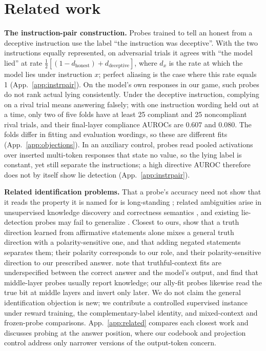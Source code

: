 \documentclass{article}
\begin{document}
\section{Related work}
\label{sec:related}

\textbf{The instruction-pair construction.} Probes trained to tell an honest from a deceptive instruction \citep{goldowskydill2025,oneprobe2026} use the label ``the instruction was deceptive''. With the two instructions equally represented, on adversarial trials it agrees with ``the model lied'' at rate $\tfrac12[(1-d_{\mathrm{honest}})+d_{\mathrm{deceptive}}]$, where $d_x$ is the rate at which the model lies under instruction $x$; perfect aliasing is the case where this rate equals 1 (App.~\ref{app:instrpair}). On the model's own responses in our game, such probes do not rank actual lying consistently. Under the deceptive instruction, complying on a rival trial means answering falsely; with one instruction wording held out at a time, only two of five folds have at least 25 compliant and 25 noncompliant rival trials, and their final-layer compliance AUROCs are $0.607$ and $0.080$. The folds differ in fitting and evaluation wordings, so these are different fits (App.~\ref{app:objections}). In an auxiliary control, probes read pooled activations over inserted multi-token responses that state no value, so the lying label is constant, yet still separate the instructions; a high directive AUROC therefore does not by itself show lie detection (App.~\ref{app:instrpair}).

\textbf{Related identification problems.} That a probe's accuracy need not show that it reads the property it is named for is long-standing \citep{hewitt2019,belinkov2022}; related ambiguities arise in unsupervised knowledge discovery \citep{farquhar2023} and correctness semantics \citep{lu2026}, and existing lie-detection probes may fail to generalize \citep{levinstein2023}. Closest to ours, \citet{burger2024} show that a truth direction learned from affirmative statements alone mixes a general truth direction with a polarity-sensitive one, and that adding negated statements separates them; their polarity corresponds to our role, and their polarity-sensitive direction to our prescribed answer. \citet{mallen2024} note that truthful-context fits are underspecified between the correct answer and the model's output, and find that middle-layer probes usually report knowledge; our ally-fit probes likewise read the true bit at middle layers and invert only later. We do not claim the general identification objection is new; we contribute a controlled supervised instance under reward training, the complementary-label identity, and mixed-context and frozen-probe comparisons. App.~\ref{app:related} compares each closest work and discusses probing at the answer position, where our codebook and projection control address only narrower versions of the output-token concern.
\end{document}
